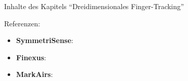 Inhalte des Kapitels \enquote{Dreidimensionales Finger-Tracking}

\noindent Referenzen:
\begin{itemize}
\item \textbf{SymmetriSense}: \cite{Yoo.2015}
\item \textbf{Finexus}: \cite{Chen.2015}
\item \textbf{MarkAirs}: \cite{GarciaSanjuan.2015}
\end{itemize}